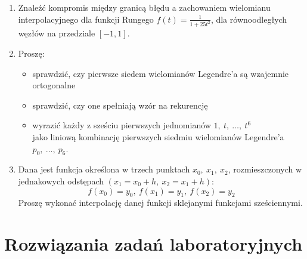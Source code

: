 \documentclass{article}
\begin{document}
\begin{enumerate}
    \item Znaleźć kompromis między granicą błędu a zachowaniem wielomianu interpolacyjnego dla funkcji Rungego \(f(t) = \frac{1}{1 + 25t^2}\), dla równoodległych węzłów na przedziale \([-1,1]\).
    \item Proszę:
    \begin{itemize}
        \item sprawdzić, czy pierwsze siedem wielomianów Legendre’a są wzajemnie ortogonalne
        \item sprawdzić, czy one spełniają wzór na rekurencję
        \item wyrazić każdy z sześciu pierwszych jednomianów \(1,\ t,\ \ldots,\ t^6\)\\
        jako liniową kombinację pierwszych siedmiu wielomianów Legendre’a \(p_0,\ \ldots,\ p_6\).
    \end{itemize}
    \item Dana jest funkcja określona w trzech punktach \(x_0,\ x_1,\ x_2\), rozmieszczonych w jednakowych odstępach \((x_1 = x_0 + h,\ x_2 = x_1 + h)\):
      \[f(x_0) = y_0,\ f(x_1) = y_1,\ f(x_2) = y_2\]
    Proszę wykonać interpolację danej funkcji sklejanymi funkcjami sześciennymi.
\end{enumerate}

\section{Rozwiązania zadań laboratoryjnych}
\end{document}

